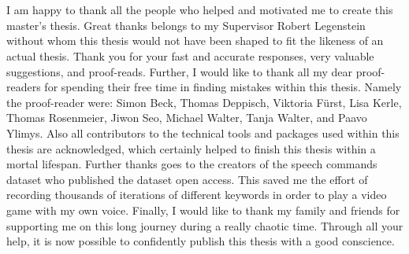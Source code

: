 
\chapter*{}
I am happy to thank all the people who helped and motivated me to create this master's thesis.
Great thanks belongs to my Supervisor Robert Legenstein without whom this thesis would not have been shaped to fit the likeness of an actual thesis.
Thank you for your fast and accurate responses, very valuable suggestions, and proof-reads.
Further, I would like to thank all my dear proof-readers for spending their free time in finding mistakes within this thesis.
Namely the proof-reader were: Simon Beck, Thomas Deppisch, Viktoria Fürst, Lisa Kerle, Thomas Rosenmeier, Jiwon Seo, Michael Walter, Tanja Walter, and Paavo Ylimys.
Also all contributors to the technical tools and packages used within this thesis are acknowledged, which certainly helped to finish this thesis within a mortal lifespan.
Further thanks goes to the creators of the speech commands dataset who published the dataset open access.
This saved me the effort of recording thousands of iterations of different keywords in order to play a video game with my own voice.
Finally, I would like to thank my family and friends for supporting me on this long journey during a really chaotic time.
Through all your help, it is now possible to confidently publish this thesis with a good conscience.